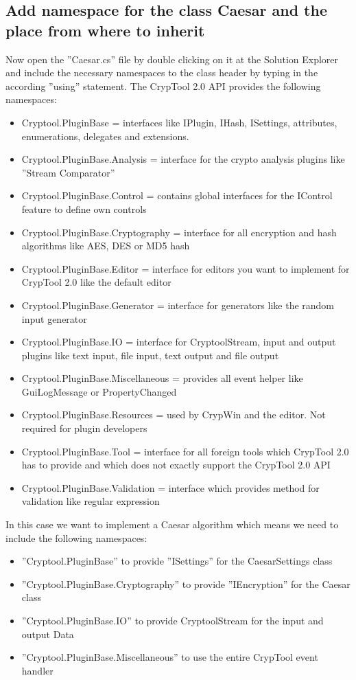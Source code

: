 \subsection{Add namespace for the class Caesar and the place from where to inherit}
\label{sec:AddNamespaceForTheClassCaesarAndThePlaceFromWhereToInherit}
Now open the ''Caesar.cs'' file by double clicking on it at the Solution Explorer and include the necessary namespaces to the class header by typing in the according ''using'' statement. The CrypTool 2.0 API provides the following namespaces:
\begin{itemize}
	\item Cryptool.PluginBase = interfaces like IPlugin, IHash, ISettings, attributes, enumerations, delegates and extensions.
	\item Cryptool.PluginBase.Analysis = interface for the crypto analysis plugins like ''Stream Comparator''
	\item Cryptool.PluginBase.Control = contains global interfaces for the IControl feature to define own controls
	\item Cryptool.PluginBase.Cryptography = interface for all encryption and hash algorithms like AES, DES or MD5 hash
	\item Cryptool.PluginBase.Editor = interface for editors you want to implement for CrypTool 2.0 like the default editor
	\item Cryptool.PluginBase.Generator = interface for generators like the random input generator
	\item Cryptool.PluginBase.IO = interface for CryptoolStream, input and output plugins like text input, file input, text output and file output
	\item Cryptool.PluginBase.Miscellaneous = provides all event helper like GuiLogMessage or PropertyChanged
	\item Cryptool.PluginBase.Resources = used by CrypWin and the editor. Not required for plugin developers
	\item Cryptool.PluginBase.Tool = interface for all foreign tools which CrypTool 2.0 has to provide and which does not exactly support the CrypTool 2.0 API
	\item Cryptool.PluginBase.Validation = interface which provides method for validation like regular expression
\end{itemize}
In this case we want to implement a Caesar algorithm which means we need to include the following namespaces:
\begin{itemize}
	\item ''Cryptool.PluginBase'' to provide ''ISettings'' for the CaesarSettings class
	\item ''Cryptool.PluginBase.Cryptography'' to provide ''IEncryption'' for the Caesar class
	\item ''Cryptool.PluginBase.IO'' to provide CryptoolStream for the input and output Data
	\item ''Cryptool.PluginBase.Miscellaneous'' to use the entire CrypTool event handler
\end{itemize}
